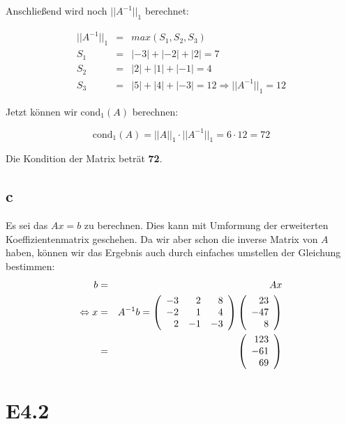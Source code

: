 \documentclass[12pt]{article}
\begin{document}
Anschließend wird noch $||A^{-1}||_1$ berechnet:

\begin{eqnarray*}
||A^{-1}||_1 & = & max(S_1, S_2, S_3) \\
S_1 & = & |-3| + |-2| + |2| =  7 \\
S_2 & = & |2|+|1|+|-1|  =  4 \\
S_3 & = & |5|+|4|+|-3|  = 12 \Rightarrow  ||A^{-1}||_1  =  12
\end{eqnarray*}

Jetzt können wir $\text{cond}_1(A)$ berechnen:

$$
\text{cond}_1(A) = ||A||_1 \cdot ||A^{-1}||_1 = 6 \cdot 12 = 72
$$

Die Kondition der Matrix beträt \textbf{72}.

\subsection*{c}
Es sei das $Ax=b$ zu berechnen. Dies kann mit Umformung der erweiterten Koeffizientenmatrix geschehen.
Da wir aber schon die inverse Matrix von $A$ haben, können wir das Ergebnis auch durch einfaches umstellen der Gleichung bestimmen:
\begin{eqnarray*}
b & = & Ax  \\
 \Leftrightarrow  x & = & A^{-1} b = \left ( 
	\begin{array}{r r r}
		-3 & 2 & 8 \\
		-2 & 1 & 4 \\
		2  & -1 & -3 \\
	\end{array}
	\right)
	\left ( 
	\begin{array}{r}
		23 \\
		-47 \\
		8 \\
	\end{array}
	\right) \\
	& = &
		\left ( 
	\begin{array}{r}
		123 \\
		-61 \\
		69 \\
	\end{array}
	\right)
\end{eqnarray*}

\newpage



\section*{E4.2}
\end{document}
